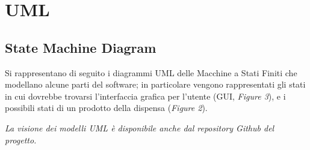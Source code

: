 \documentclass{article}
\begin{document}
\section{UML}
\subsection{State Machine Diagram}
Si rappresentano di seguito i diagrammi UML delle Macchine a Stati Finiti che modellano alcune parti del software; in particolare vengono rappresentati gli stati in cui dovrebbe trovarsi l'interfaccia grafica per l'utente (GUI, \textit{Figure 3}), e i possibili stati di un prodotto della dispensa (\textit{Figure 2}). 
\newline 

\textit{\textcolor{black!60}{La visione dei modelli UML è disponibile anche dal repository Github del progetto.}}
\end{document}
